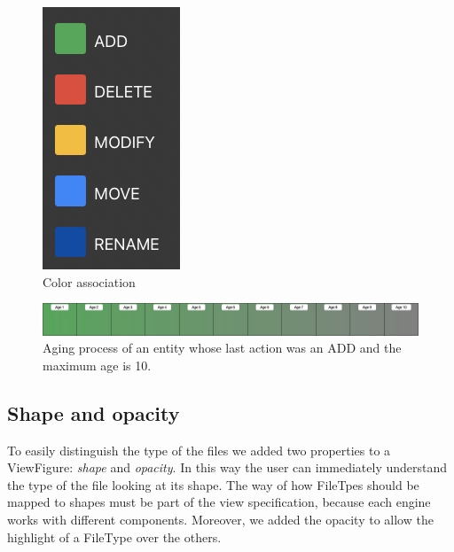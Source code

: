\begin{figure}
    \begin{center}
        \includegraphics[width=0.7\linewidth]{ColorAssociation.png} 
        \caption{Color association}
        \label{fig:ColorAssociation}
    \end{center}
\end{figure}

\begin{figure}
    \center
    \includegraphics[width=\textwidth]{Aging.jpg}
    \caption{Aging process of an entity whose last action was an ADD and the maximum age is 10. }
    \label{fig:Aging}
\end{figure}



\subsection*{Shape and opacity}
To easily distinguish the type of the files we added two properties to a ViewFigure: \textit{shape} and \textit{opacity}. 
In this way the user can immediately understand the type of the file looking at its shape. The way of how FileTpes should be mapped to shapes must be part of the view specification, because each engine works with different components. 
\bigbreak
Moreover, we added the opacity to allow the highlight of a FileType over the others. 


